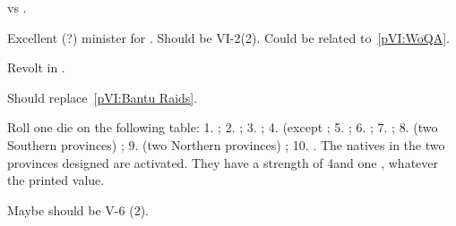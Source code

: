 \begin{todo}
  \SPA vs \paysNaples.
\end{todo}

\begin{todo}
  Excellent (?) minister for \HIS. Should be VI-2(2). Could be related
  to~\ref{pVI:WoQA}.
\end{todo}

\begin{todo}
  Revolt in \paysAstrakhan.
\end{todo}



\begin{todo}
  Should replace~\ref{pVI:Bantu Raids}.
\end{todo}

\phevnt
\aparag Roll one die on the following table: 1. \granderegionSenegal ;
2. \granderegionCotedivoire ; 3. \granderegionCotedor ;
4. \granderegionCameroun (except ; 5. \granderegionGabon
; 6. \granderegionCongo ; 7. \granderegionAngola ; 8. \granderegionNyasa (two
Southern provinces) ; 9. \granderegionNyasa (two Northern provinces) ;
10. \granderegionKenya.
\bparag The natives in the two provinces designed are activated. They have a
strength of 4\LD and one \LeaderG, whatever the printed value.

\begin{todo}
  Maybe should be V-6 (2).
\end{todo}




